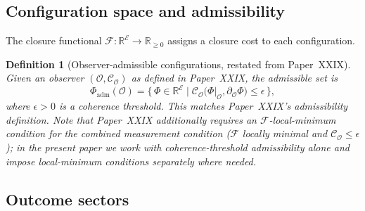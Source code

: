 \documentclass[12pt]{article}
\newtheorem{definition}[theorem]{Definition}
\newcommand{\Ecal}{\mathcal{E}}
\newcommand{\Fcal}{\mathcal{F}}
\newcommand{\Ocal}{\mathcal{O}}
\newcommand{\Ccal}{\mathcal{C}}
\begin{document}
\subsection{Configuration space and admissibility}

The closure functional $\Fcal: \mathbb{R}^\Ecal \to \mathbb{R}_{\geq 0}$ assigns a closure cost to each configuration.

\begin{definition}[Observer-admissible configurations, restated from Paper~XXIX]\label{def:admissible}
Given an observer $(\Ocal, \Ccal_\Ocal)$ as defined in Paper~XXIX, the admissible set is
\begin{equation}\label{eq:admissible}
    \Phi_{\mathrm{adm}}(\Ocal) = \bigl\{\, \Phi \in \mathbb{R}^\Ecal \;\big|\; \Ccal_\Ocal\!\bigl(\Phi|_\Ocal, \partial_\Ocal \Phi\bigr) \leq \epsilon \,\bigr\},
\end{equation}
where $\epsilon > 0$ is a coherence threshold. This matches Paper~XXIX's admissibility definition. Note that Paper~XXIX additionally requires an $\Fcal$-local-minimum condition for the combined measurement condition ($\Fcal$ locally minimal \emph{and} $\Ccal_\Ocal \leq \epsilon$); in the present paper we work with coherence-threshold admissibility alone and impose local-minimum conditions separately where needed.
\end{definition}

\subsection{Outcome sectors}
\end{document}

